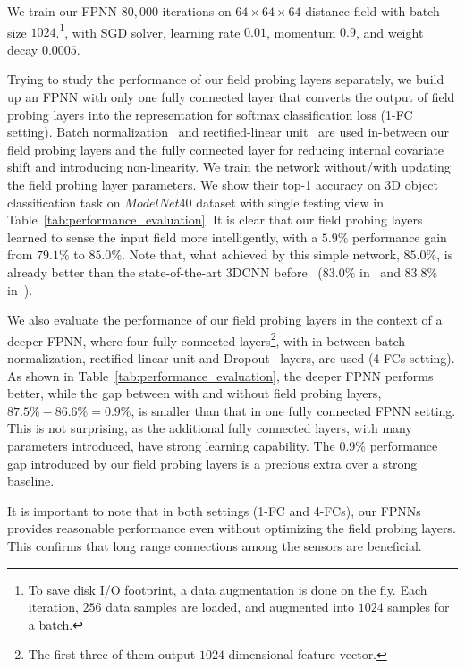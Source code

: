 We train our FPNN $80,000$ iterations on $64 \times 64 \times 64$ distance field with batch size $1024$.\footnote{To save disk I/O footprint, a data augmentation is done on the fly. Each iteration, $256$ data samples are loaded, and augmented into $1024$ samples for a batch.}, with SGD solver, learning rate $0.01$, momentum $0.9$, and weight decay $0.0005$.

Trying to study the performance of our field probing layers separately, we build up an FPNN with only one fully connected layer that converts the output of field probing layers into the representation for softmax classification loss (1-FC setting). Batch normalization~\cite{ioffe2015batch} and rectified-linear unit~\cite{nair2010rectified} are used in-between our field probing layers and the fully connected layer for reducing internal covariate shift and introducing non-linearity. We train the network without/with updating the field probing layer parameters. We show their top-1 accuracy on 3D object classification task on $ModelNet40$ dataset with single testing view in Table~\ref{tab:performance_evaluation}. It is clear that our field probing layers learned to sense the input field more intelligently, with a $5.9\%$ performance gain from $79.1\%$ to $85.0\%$. Note that, what achieved by this simple network, $85.0\%$, is already better than the state-of-the-art 3DCNN before~\cite{qi2016volumetric} ($83.0\%$ in~\cite{WU_CVPR15_3D} and $83.8\%$ in~\cite{Maturana_IROS15_VoxNet}).

We also evaluate the performance of our field probing layers in the context of a deeper FPNN, where four fully connected layers\footnote{The first three of them output $1024$ dimensional feature vector.}, with in-between batch normalization, rectified-linear unit and Dropout~\cite{srivastava2014dropout} layers, are used (4-FCs setting). As shown in Table~\ref{tab:performance_evaluation}, the deeper FPNN performs better, while the gap between with and without field probing layers, $87.5\%-86.6\%=0.9\%$, is smaller than that in one fully connected FPNN setting. This is not surprising, as the additional fully connected layers, with many parameters introduced, have strong learning capability. The $0.9\%$ performance gap introduced by our field probing layers is a precious extra over a strong baseline.

It is important to note that in both settings (1-FC and 4-FCs), our FPNNs provides reasonable performance even without optimizing the field probing layers. This confirms that long range connections among the sensors are beneficial.

